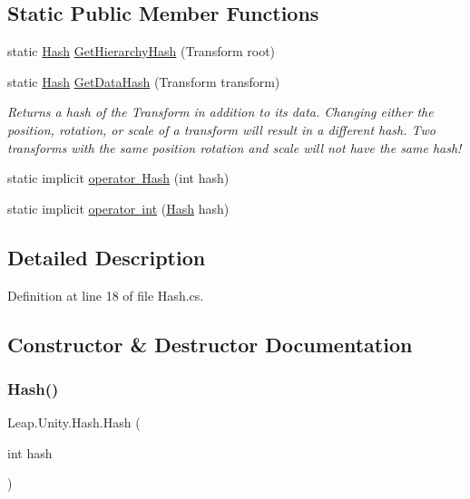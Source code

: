 \subsection*{Static Public Member Functions}
\begin{DoxyCompactItemize}
\item 
static \mbox{\hyperlink{struct_leap_1_1_unity_1_1_hash}{Hash}} \mbox{\hyperlink{struct_leap_1_1_unity_1_1_hash_a02e356e1c90fafe7904d699cb197552d}{Get\+Hierarchy\+Hash}} (Transform root)
\item 
static \mbox{\hyperlink{struct_leap_1_1_unity_1_1_hash}{Hash}} \mbox{\hyperlink{struct_leap_1_1_unity_1_1_hash_a041d41aae91527057d3731f07c41a29b}{Get\+Data\+Hash}} (Transform transform)
\begin{DoxyCompactList}\small\item\em Returns a hash of the Transform in addition to it\textquotesingle{}s data. Changing either the position, rotation, or scale of a transform will result in a different hash. Two transforms with the same position rotation and scale will not have the same hash! \end{DoxyCompactList}\item 
static implicit \mbox{\hyperlink{struct_leap_1_1_unity_1_1_hash_a038bce1286e011a879e995b1e094d138}{operator Hash}} (int hash)
\item 
static implicit \mbox{\hyperlink{struct_leap_1_1_unity_1_1_hash_a85fa52543cbef6d3ee6e5cbd58e05da9}{operator int}} (\mbox{\hyperlink{struct_leap_1_1_unity_1_1_hash}{Hash}} hash)
\end{DoxyCompactItemize}


\subsection{Detailed Description}


Definition at line 18 of file Hash.\+cs.



\subsection{Constructor \& Destructor Documentation}
\mbox{\label{struct_leap_1_1_unity_1_1_hash_afaa1c83436400dc4f74450e95d278689}} 
\subsubsection{\texorpdfstring{Hash()}{Hash()}}
{\footnotesize\ttfamily Leap.\+Unity.\+Hash.\+Hash (\begin{DoxyParamCaption}\item[{int}]{hash }\end{DoxyParamCaption})}



